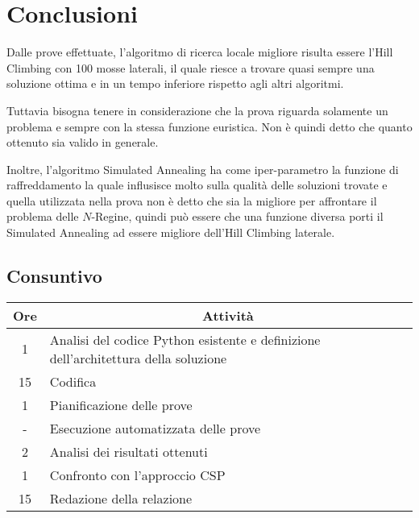 \clearpage
\section{Conclusioni}

Dalle prove effettuate, l'algoritmo di ricerca locale migliore risulta essere l'Hill Climbing con 100 mosse laterali, il quale riesce a trovare quasi sempre una soluzione ottima e in un tempo inferiore rispetto agli altri algoritmi.

Tuttavia bisogna tenere in considerazione che la prova riguarda solamente un problema e sempre con la stessa funzione euristica. Non è quindi detto che quanto ottenuto sia valido in generale.

Inoltre, l'algoritmo Simulated Annealing ha come iper-parametro la funzione di raffreddamento la quale influsisce molto sulla qualità delle soluzioni trovate e quella utilizzata nella prova non è detto che sia la migliore per affrontare il problema delle $N$-Regine, quindi può essere che una funzione diversa porti il Simulated Annealing ad essere migliore dell'Hill Climbing laterale.

\subsection{Consuntivo}

\begin{table}[h]
\centering
\begin{tabular}{|c|l|}
\hline
Ore & \multicolumn{1}{c|}{Attività}                                                       \\ \hline
1   & Analisi del codice Python esistente e definizione dell'architettura della soluzione \\ \hline
15  & Codifica                                                                            \\ \hline
1   & Pianificazione delle prove                                                          \\ \hline
-   & Esecuzione automatizzata delle prove                                                \\ \hline
2   & Analisi dei risultati ottenuti                                                      \\ \hline
1   & Confronto con l'approccio CSP                                                       \\ \hline
15  & Redazione della relazione                                                           \\ \hline
\end{tabular}
\end{table}

\FloatBarrier